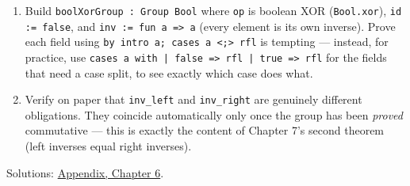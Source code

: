 \begin{enumerate}
\item
  Build \texttt{boolXorGroup : Group Bool} where \texttt{op} is boolean XOR (\texttt{Bool.xor}), \texttt{id := false}, and \texttt{inv := fun a => a} (every element is its own inverse). Prove each field using \texttt{by intro a; cases a <;> rfl} is tempting --- instead, for practice, use \texttt{cases a with | false => rfl | true => rfl} for the fields that need a case split, to see exactly which case does what.
\item
  Verify on paper that \texttt{inv\_\allowbreak{}left} and \texttt{inv\_\allowbreak{}right} are genuinely different obligations. They coincide automatically only once the group has been \emph{proved} commutative --- this is exactly the content of Chapter 7's second theorem (left inverses equal right inverses).
\end{enumerate}

Solutions: \hyperref[sec:14-appendix-solutions:05-chapter-6:1]{Appendix, Chapter 6}.

